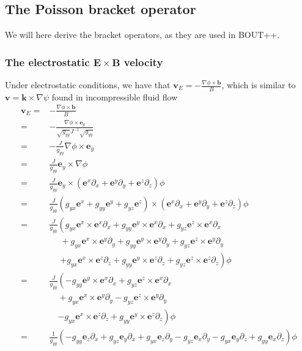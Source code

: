 \documentclass[12pt]{article}
\def\L{\left}
\def\R{\right}
\newcommand{\ve}[1]{\ensuremath{\boldsymbol{#1}}}
\begin{document}
\subsection{The Poisson bracket operator}
%
We will here derive the bracket operators, as they are used in BOUT++.


\subsubsection{The electrostatic \texorpdfstring{$\ve{E}\times \ve{B}$}{ExB}
%
               velocity}
%
Under electrostatic conditions, we have that $\ve{v}_E =
-\frac{\nabla\phi\times\ve{b}}{B}$, which is similar to
$\ve{v}=\ve{k}\times\nabla\psi$ found in incompressible fluid flow
%
\begin{align*}
    \ve{v}_E =& -\frac{\nabla\phi\times\ve{b}}{B}\\
             =&-\frac{\nabla\phi\times\ve{e}_y}{
\sqrt{g_{yy}}J^{-1}\sqrt{g_{yy}}}\\
             =&-\frac{J}{g_{yy}}\nabla\phi\times\ve{e}_y\\
             =&\frac{J}{g_{yy}}\ve{e}_y\times\nabla\phi\\
             =&\frac{J}{g_{yy}}\ve{e}_y\times \L(\ve{e}^x\partial_x + \ve{e}^y\partial_y +
\ve{e}^z\partial_z\R)\phi\\
             =&\frac{J}{g_{yy}} \L(g_{yx}\ve{e}^x + g_{yy}\ve{e}^y +
g_{yz}\ve{e}^z\R) \times \L(\ve{e}^x\partial_x + \ve{e}^y\partial_y +
\ve{e}^z\partial_z\R)\phi\\
             =&\frac{J}{g_{yy}} \L( g_{yx}\ve{e}^x\times\ve{e}^x\partial_x +
g_{yy}\ve{e}^y\times\ve{e}^x\partial_x + g_{yz}\ve{e}^z\times\ve{e}^x\partial_x
\R.  \\ &\quad\; + g_{yx}\ve{e}^x\times\ve{e}^y\partial_y +
g_{yy}\ve{e}^y\times\ve{e}^y\partial_y + g_{yz}\ve{e}^z\times\ve{e}^y\partial_y
\\ &\quad\; \L.  + g_{yx}\ve{e}^x\times\ve{e}^z\partial_z +
g_{yy}\ve{e}^y\times\ve{e}^z\partial_z + g_{yz}\ve{e}^z\times\ve{e}^z\partial_z
\R) \phi\\
             =&\frac{J}{g_{yy}} \L( - g_{yy}\ve{e}^y\times\ve{e}^x\partial_x +
g_{yz}\ve{e}^z\times\ve{e}^x\partial_x \R.  \\ &\quad +
g_{yx}\ve{e}^x\times\ve{e}^y\partial_y - g_{yz}\ve{e}^z\times\ve{e}^y\partial_y
\\ &\quad \L.  - g_{yx}\ve{e}^x\times\ve{e}^z\partial_z +
g_{yy}\ve{e}^y\times\ve{e}^z\partial_z \R) \phi\\
             =&\frac{1}{g_{yy}} \L( - g_{yy}\ve{e}_z\partial_x +
g_{yz}\ve{e}_y\partial_x + g_{yx}\ve{e}_z\partial_y - g_{yz}\ve{e}_x\partial_y
- g_{yx}\ve{e}_y\partial_z + g_{yy}\ve{e}_x\partial_z \R) \phi
\end{align*}
%
\end{document}
